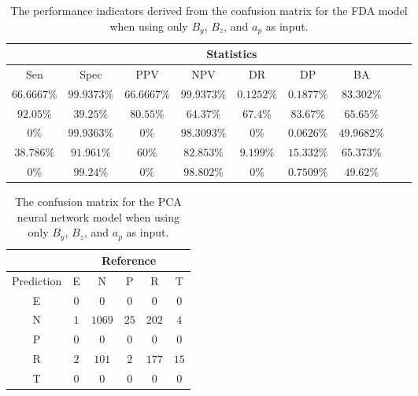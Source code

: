 \begin{table}[!ht]
	\centering
	\begin{tabular}{|c|c|c|c|c|c|c|c|c|}
		\hline
		 & \multicolumn{7}{c|}{Statistics} \\ \hline
		Sen & Spec & PPV & NPV & DR & DP & BA \\ \hline
		$66.6667\%$ & $99.9373\%$ & $66.6667\%$ & $99.9373\%$ & $0.1252\%$ & $0.1877\%$ & $83.302\%$ \\ \hline
		$92.05\%$ & $39.25\%$ & $80.55\%$ & $64.37\%$ & $67.4\%$ & $83.67\%$ & $65.65\%$ \\ \hline
		$0\%$ & $99.9363\%$ & $0\%$ & $98.3093\%$ & $0\%$ & $0.0626\%$ & $49.9682\%$ \\ \hline
		$38.786\%$ & $91.961\%$ & $60\%$ & $82.853\%$ & $9.199\%$ & $15.332\%$ & $65.373\%$ \\ \hline
		$0\%$ & $99.24\%$ & $0\%$ & $98.802\%$ & $0\%$ & $0.7509\%$ & $49.62\%$ \\ \hline
	\end{tabular}
	\caption{The performance indicators derived from the confusion matrix for the FDA model when using only $B_{y}$, $B_{z}$, and $a_{p}$ as input.}
	\label{tab:cs:yzap:fda}
\end{table}

\begin{table}[!ht]
	\centering
	\begin{tabular}{|c|c|c|c|c|c|}
		\hline
		 & \multicolumn{5}{|c|}{Reference} \\ \hline
		 Prediction & E & N & P & R & T \\ \hline
		 E & $0$ & $0$ & $0$ & $0$ & $0$ \\ \hline
		 N & $1$ & $1069$ & $25$ & $202$ & $4$ \\ \hline
		 P & $0$ & $0$ & $0$ & $0$ & $0$ \\ \hline
		 R & $2$ & $101$ & $2$ & $177$ & $15$ \\ \hline
		 T & $0$ & $0$ & $0$ & $0$ & $0$ \\ \hline
	\end{tabular}
	\caption{The confusion matrix for the PCA neural network model when using only $B_{y}$, $B_{z}$, and $a_{p}$ as input.}
	\label{tab:cm:yzap:pcaNNet}
\end{table}

